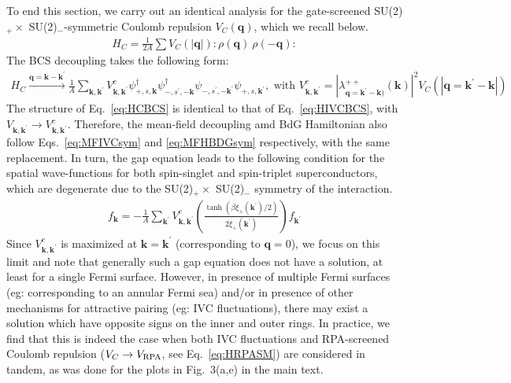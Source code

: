 \documentclass[aps,pra,twocolumn,superscriptaddress,10pt,article,nofootinbib,showpacs,longbibliography]{revtex4-1}
\def \k{{\mathbf k}}
\def \q{{\mathbf q}}
\def \beq{\begin{eqnarray}}
\def \eeq{\end{eqnarray}}
\begin{document}
To end this section, we carry out an identical analysis for the gate-screened SU(2)$_+ \times$ SU(2)$_-$-symmetric Coulomb repulsion $V_C(\q)$, which we recall below.
\beq
H_C = \frac{1}{2A} \sum V_{C}(|\q|) : \rho(\q)  ~\rho(-\q) :  
\eeq
The BCS decoupling takes the following form:
\beq
H_{C} \xrightarrow{\q = \k - \k^\prime} \frac{1}{A} \sum_{\k, \k^\prime} V^c_{\k, \k^\prime} \psi^\dagger_{+,s, \k} \psi^\dagger_{-,s^\prime, -\k} \psi_{-,s^\prime,-\k^\prime} \psi_{+, s, \k^\prime}, \text{ with } V^c_{\k, \k^\prime} = |\lambda^{++}_{\q= \k^\prime - \k)}(\k)|^2 V_C(|\q = \k^\prime - \k|) ~~~~~~
\label{eq:HCBCS}
\eeq
The structure of Eq.~\eqref{eq:HCBCS} is identical to that of Eq.~\eqref{eq:HIVCBCS}, with $V_{\k,\k^\prime} \to V^c_{\k, \k^\prime}$.
Therefore, the mean-field decoupling amd BdG Hamiltonian also follow Eqs.~\eqref{eq:MFIVCsym} and \eqref{eq:MFHBDGsym} respectively, with the same replacement.
In turn, the gap equation leads to the following condition for the spatial wave-functions for both spin-singlet and spin-triplet superconductors, which are degenerate due to the SU(2)$_+ \times$ SU(2)$_-$ symmetry of the interaction.
\beq
f_\k = -\frac{1}{A} \sum_{\k^\prime} V^{c}_{\k, \k^\prime} \left( \frac{\tanh(\beta \xi_+(\k^\prime)/2) }{2 \xi_+(\k^\prime)} \right) f_{\k^\prime}
\eeq
Since $V^{c}_{\k, \k^\prime}$ is maximized at $\k = \k^\prime$ (corresponding to $\q = 0$), we focus on this limit and note that generally such a gap equation does not have a solution, at least for a single Fermi surface.
However, in presence of multiple Fermi surfaces (eg: corresponding to an annular Fermi sea) and/or in presence of other mechanisms for attractive pairing (eg: IVC fluctuations), there may exist a solution which have opposite signs on the inner and outer rings.
In practice, we find that this is indeed the case when both IVC fluctuations and RPA-screened Coulomb repulsion ($V_C \to V_{\rm RPA}$, see Eq.~\ref{eq:HRPASM}) are considered in tandem, as was done for the plots in Fig.~3(a,e) in the main text.
\end{document}
